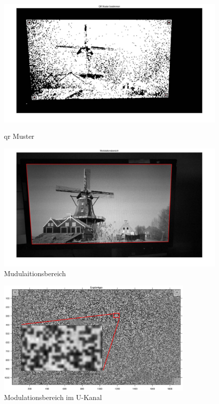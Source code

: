 \begin{figure}[H]
\centering 
\begin{minipage}[b]{0.49\textwidth} 
\centering 
\includegraphics[width=1.0\textwidth]{images/5_Implementirung/QR_muster.pdf} 
\caption{\gls{qr} Muster}
\label{fig:QR_muster}
\end{minipage}
\begin{minipage}[b]{0.49\textwidth} 
\centering 
\includegraphics[width=1.0\textwidth]{images/5_Implementirung/Mudulaition.pdf}
\caption{Mudulaitionsbereich}
\label{fig:Mudulaitionbereich}
\end{minipage}
\end{figure}

\begin{figure}[H]
 \centering 
  \includegraphics[keepaspectratio,width=0.85\textwidth]{images/5_Implementirung/diffq8.eps}
 \caption{Modulationsbereich im U-Kanal}
 \label{fig:Ergebnis1}
\end{figure}

